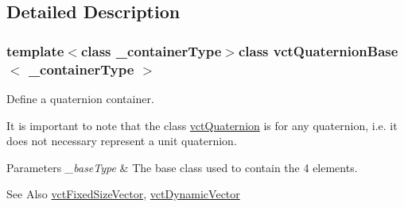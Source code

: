 \subsection{Detailed Description}
\subsubsection*{template$<$class \-\_\-container\-Type$>$class vct\-Quaternion\-Base$<$ \-\_\-container\-Type $>$}

Define a quaternion container. 

It is important to note that the class \hyperlink{classvct_quaternion}{vct\-Quaternion} is for any quaternion, i.\-e. it does not necessary represent a unit quaternion.


\begin{DoxyParams}{Parameters}
{\em \-\_\-base\-Type} & The base class used to contain the 4 elements.\\
\hline
\end{DoxyParams}
\begin{DoxySeeAlso}{See Also}
\hyperlink{classvct_fixed_size_vector}{vct\-Fixed\-Size\-Vector}, \hyperlink{classvct_dynamic_vector}{vct\-Dynamic\-Vector} 
\end{DoxySeeAlso}


